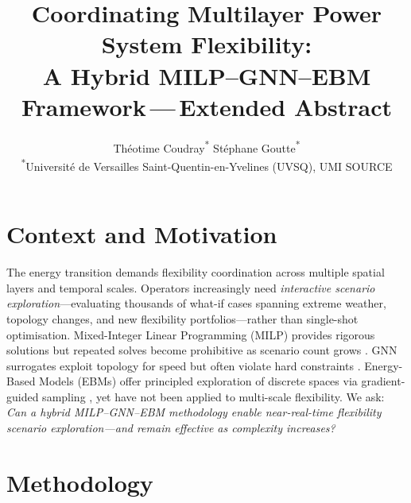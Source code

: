 \documentclass[10pt]{article}
\title{Coordinating Multilayer Power System Flexibility:\\
A Hybrid MILP--GNN--EBM Framework\,---\,Extended Abstract}
\author{Th\'eotime Coudray\textsuperscript{*} \quad St\'ephane Goutte\textsuperscript{*}\\[1pt]
{\small \textsuperscript{*}Universit\'e de Versailles Saint-Quentin-en-Yvelines (UVSQ), UMI SOURCE}}
\date{}
\makeatletter
\renewcommand{\maketitle}{%
  \begin{center}
    {\large\bfseries \@title \par}
    \vspace{2pt}
    {\normalsize \@author \par}
  \end{center}
  \vspace{-6pt}
}
\makeatother
\begin{document}
\maketitle

\section{Context and Motivation}

The energy transition demands flexibility coordination across multiple spatial layers and temporal scales. Operators increasingly need \emph{interactive scenario exploration}---evaluating thousands of what-if cases spanning extreme weather, topology changes, and new flexibility portfolios---rather than single-shot optimisation. Mixed-Integer Linear Programming (MILP) provides rigorous solutions but repeated solves become prohibitive as scenario count grows \citep{conejo_investment_2016, micheli_two-stage_2023}. GNN surrogates exploit topology for speed but often violate hard constraints \citep{liu_topology-aware_2023}. Energy-Based Models (EBMs) offer principled exploration of discrete spaces via gradient-guided sampling \citep{sun_annealed_2022}, yet have not been applied to multi-scale flexibility. We ask: \emph{Can a hybrid MILP--GNN--EBM methodology enable near-real-time flexibility scenario exploration---and remain effective as complexity increases?}

\section{Methodology}
\end{document}

